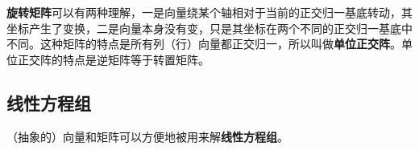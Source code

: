 
\textbf{旋转矩阵}可以有两种理解，一是向量绕某个轴相对于当前的正交归一基底转动，其坐标产生了变换，二是向量本身没有变，只是其坐标在两个不同的正交归一基底中不同。这种矩阵的特点是所有列（行）向量都正交归一，所以叫做\textbf{单位正交阵}。单位正交阵的特点是逆矩阵等于转置矩阵。






\subsection{线性方程组}

（抽象的）向量和矩阵可以方便地被用来解\textbf{线性方程组}。
